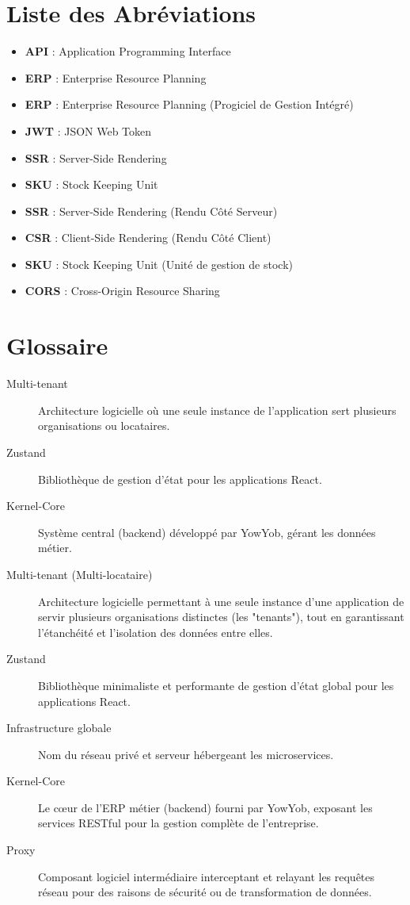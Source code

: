 \documentclass[12pt, a4paper]{report}
\begin{document}
\chapter*{Liste des Abréviations}
\begin{itemize}
    \item \textbf{API} : Application Programming Interface
    \item \textbf{ERP} : Enterprise Resource Planning
    \item \textbf{ERP} : Enterprise Resource Planning (Progiciel de Gestion Intégré)
    \item \textbf{JWT} : JSON Web Token
    \item \textbf{SSR} : Server-Side Rendering
    \item \textbf{SKU} : Stock Keeping Unit
    \item \textbf{SSR} : Server-Side Rendering (Rendu Côté Serveur)
    \item \textbf{CSR} : Client-Side Rendering (Rendu Côté Client)
    \item \textbf{SKU} : Stock Keeping Unit (Unité de gestion de stock)
    \item \textbf{CORS} : Cross-Origin Resource Sharing
\end{itemize}
\chapter*{Glossaire}
\begin{description}
    \item[Multi-tenant] Architecture logicielle où une seule instance de l'application sert plusieurs organisations ou locataires.
    \item[Zustand] Bibliothèque de gestion d'état pour les applications React.
    \item[Kernel-Core] Système central (backend) développé par YowYob, gérant les données métier.
    \item[Multi-tenant (Multi-locataire)] Architecture logicielle permettant à une seule instance d'une application de servir plusieurs organisations distinctes (les "tenants"), tout en garantissant l'étanchéité et l'isolation des données entre elles.
    \item[Zustand] Bibliothèque minimaliste et performante de gestion d'état global pour les applications React.
    \item[Infrastructure globale] Nom du réseau privé et serveur hébergeant les microservices.
    \item[Kernel-Core] Le cœur de l'ERP métier (backend) fourni par YowYob, exposant les services RESTful pour la gestion complète de l'entreprise.
    \item[Proxy] Composant logiciel intermédiaire interceptant et relayant les requêtes réseau pour des raisons de sécurité ou de transformation de données.
\end{description}
\end{document}
